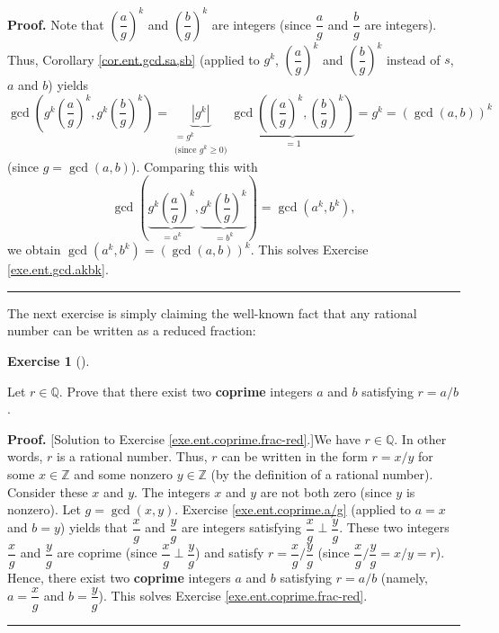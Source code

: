 \documentclass[numbers=enddot,12pt,final,onecolumn,notitlepage]{scrartcl}%
\newcounter{exer}
\numberwithin{exer}{subsection}
\theoremstyle{definition}
\newtheorem{exmp}[exer]{Exercise}
\newenvironment{exercise}[1][]
{\begin{exmp}[#1]\begin{leftbar}}
{\end{leftbar}\end{exmp}}
\newenvironment{fineprint}{\begin{small}}{\end{small}}
\newenvironment{proof}[1][Proof]{\noindent\textbf{#1.} }{\ \rule{0.5em}{0.5em}}
\begin{document}
\begin{fineprint}
\begin{proof}
Note that $\left(  \dfrac{a}{g}\right)  ^{k}$ and $\left(  \dfrac{b}%
{g}\right)  ^{k}$ are integers (since $\dfrac{a}{g}$ and $\dfrac{b}{g}$ are
integers). Thus, Corollary \ref{cor.ent.gcd.sa,sb} (applied to $g^{k}$,
$\left(  \dfrac{a}{g}\right)  ^{k}$ and $\left(  \dfrac{b}{g}\right)  ^{k}$
instead of $s$, $a$ and $b$) yields%
\[
\gcd\left(  g^{k}\left(  \dfrac{a}{g}\right)  ^{k},g^{k}\left(  \dfrac{b}%
{g}\right)  ^{k}\right)  =\underbrace{\left\vert g^{k}\right\vert
}_{\substack{=g^{k}\\\text{(since }g^{k}\geq0\text{)}}}\underbrace{\gcd\left(
\left(  \dfrac{a}{g}\right)  ^{k},\left(  \dfrac{b}{g}\right)  ^{k}\right)
}_{=1}=g^{k}=\left(  \gcd\left(  a,b\right)  \right)  ^{k}%
\]
(since $g=\gcd\left(  a,b\right)  $). Comparing this with%
\[
\gcd\left(  \underbrace{g^{k}\left(  \dfrac{a}{g}\right)  ^{k}}_{=a^{k}%
},\underbrace{g^{k}\left(  \dfrac{b}{g}\right)  ^{k}}_{=b^{k}}\right)
=\gcd\left(  a^{k},b^{k}\right)  ,
\]
we obtain $\gcd\left(  a^{k},b^{k}\right)  =\left(  \gcd\left(  a,b\right)
\right)  ^{k}$. This solves Exercise \ref{exe.ent.gcd.akbk}.
\end{proof}
\end{fineprint}

The next exercise is simply claiming the well-known fact that any rational
number can be written as a reduced fraction:

\begin{exercise}
\label{exe.ent.coprime.frac-red}Let $r\in\mathbb{Q}$. Prove that there exist
two \textbf{coprime} integers $a$ and $b$ satisfying $r=a/b$.
\end{exercise}

\begin{fineprint}
\begin{proof}
[Solution to Exercise \ref{exe.ent.coprime.frac-red}.]We have $r\in\mathbb{Q}%
$. In other words, $r$ is a rational number. Thus, $r$ can be written in the
form $r=x/y$ for some $x\in\mathbb{Z}$ and some nonzero $y\in\mathbb{Z}$ (by
the definition of a rational number). Consider these $x$ and $y$. The integers
$x$ and $y$ are not both zero (since $y$ is nonzero). Let $g=\gcd\left(
x,y\right)  $. Exercise \ref{exe.ent.coprime.a/g} (applied to $a=x$ and $b=y$)
yields that $\dfrac{x}{g}$ and $\dfrac{y}{g}$ are integers satisfying
$\dfrac{x}{g}\perp\dfrac{y}{g}$. These two integers $\dfrac{x}{g}$ and
$\dfrac{y}{g}$ are coprime (since $\dfrac{x}{g}\perp\dfrac{y}{g}$) and satisfy
$r=\dfrac{x}{g}/\dfrac{y}{g}$ (since $\dfrac{x}{g}/\dfrac{y}{g}=x/y=r$).
Hence, there exist two \textbf{coprime} integers $a$ and $b$ satisfying
$r=a/b$ (namely, $a=\dfrac{x}{g}$ and $b=\dfrac{y}{g}$). This solves Exercise
\ref{exe.ent.coprime.frac-red}.
\end{proof}
\end{fineprint}
\end{document}
